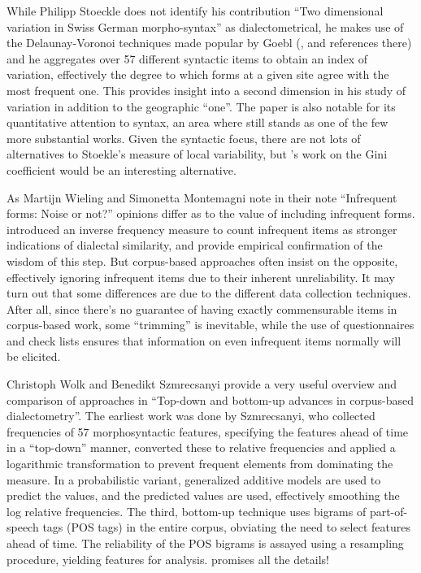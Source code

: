 \documentclass[output=paper]{LSP/langsci}
\begin{document}
While Philipp Stoeckle does not identify his contribution “Two dimensional variation in Swiss German morpho-syntax” as dialectometrical, he makes use of the Delaunay-Voronoi techniques made popular by Goebl (\citeyear{goebl_recent_2006}, and references there) and he aggregates over 57 different syntactic items to obtain an index of variation, effectively the degree to which forms at a given site agree with the most frequent one.  This provides insight into a second dimension in his study of variation in addition to the geographic “one”. The paper is also notable for its quantitative attention to syntax, an area where \citet{spruit_quantitative_2008} still stands as one of the few more substantial works. Given the syntactic focus, there are not lots of alternatives to Stoekle’s measure of local variability, but \citeauthor{kretzschmar_scaled_2013}'s work \citeyearpar{kretzschmar_scaled_2013} on the Gini coefficient would be an interesting alternative. 

As Martijn Wieling and Simonetta Montemagni note in their note “Infrequent forms: Noise or not?” opinions differ as to the value of including infrequent forms. \citet{goebl_dialektometrische_1984} introduced an inverse frequency measure to count infrequent items as stronger indications of dialectal similarity, and \citet{nerbonne_toward_2007} provide empirical confirmation of the wisdom of this step. But corpus-based approaches often insist on the opposite, effectively ignoring infrequent items due to their inherent unreliability. It may turn out that some differences are due to the different data collection techniques. After all, since there’s no guarantee of having exactly commensurable items in corpus-based work, some “trimming” is inevitable, while the use of questionnaires and check lists ensures that information on even infrequent items normally will be elicited.

Christoph Wolk and Benedikt Szmrecsanyi provide a very useful overview and comparison of approaches in “Top-down and bottom-up advances in corpus-based dialectometry”. The earliest work was done by Szmrecsanyi, who collected frequencies of 57 morphosyntactic features, specifying the features ahead of time in a “top-down” manner, converted these to relative frequencies and applied a logarithmic transformation to prevent frequent elements from dominating the measure. In a probabilistic variant, generalized additive models are used to predict the values, and the predicted values are used, effectively smoothing the log relative frequencies. The third, bottom-up technique uses bigrams of part-of-speech tags (POS tags) in the entire corpus, obviating the need to select features ahead of time. The reliability of the POS bigrams is assayed using a resampling procedure, yielding features for analysis. \citet{wolk_integrating_2014} promises all the details!
\end{document}
